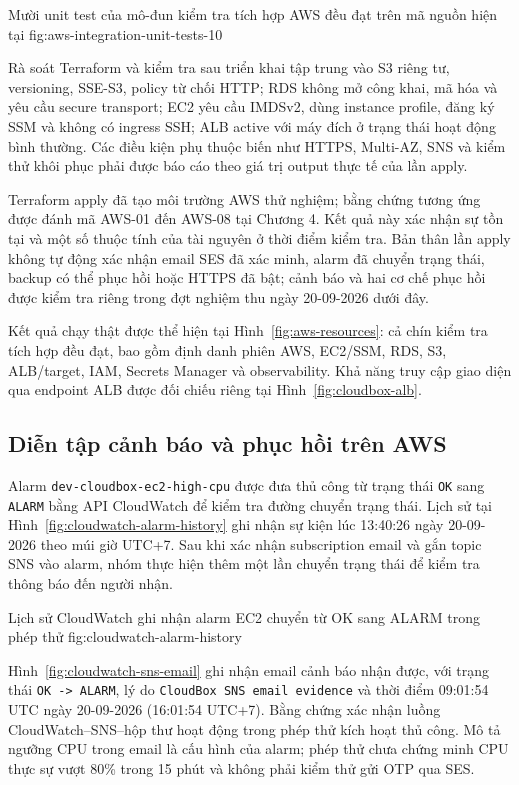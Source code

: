 {Mười unit test của mô-đun kiểm tra tích hợp AWS đều đạt trên mã nguồn hiện tại}
{fig:aws-integration-unit-tests-10}

Rà soát Terraform và kiểm tra sau triển khai tập trung vào S3 riêng tư, versioning, SSE-S3, policy từ chối HTTP; RDS không mở công khai, mã hóa và yêu cầu secure transport; EC2 yêu cầu IMDSv2, dùng instance profile, đăng ký SSM và không có ingress SSH; ALB active với máy đích ở trạng thái hoạt động bình thường. Các điều kiện phụ thuộc biến như HTTPS, Multi-AZ, SNS và kiểm thử khôi phục phải được báo cáo theo giá trị output thực tế của lần apply.

Terraform apply đã tạo môi trường AWS thử nghiệm; bằng chứng tương ứng được đánh mã AWS-01 đến AWS-08 tại Chương 4. Kết quả này xác nhận sự tồn tại và một số thuộc tính của tài nguyên ở thời điểm kiểm tra. Bản thân lần apply không tự động xác nhận email SES đã xác minh, alarm đã chuyển trạng thái, backup có thể phục hồi hoặc HTTPS đã bật; cảnh báo và hai cơ chế phục hồi được kiểm tra riêng trong đợt nghiệm thu ngày 20-09-2026 dưới đây.

Kết quả chạy thật được thể hiện tại Hình~\ref{fig:aws-resources}: cả chín kiểm tra tích hợp đều đạt, bao gồm định danh phiên AWS, EC2/SSM, RDS, S3, ALB/target, IAM, Secrets Manager và observability. Khả năng truy cập giao diện qua endpoint ALB được đối chiếu riêng tại Hình~\ref{fig:cloudbox-alb}.

\subsection{Diễn tập cảnh báo và phục hồi trên AWS}

Alarm \texttt{dev-cloudbox-ec2-high-cpu} được đưa thủ công từ trạng thái \texttt{OK} sang \texttt{ALARM} bằng API CloudWatch để kiểm tra đường chuyển trạng thái. Lịch sử tại Hình~\ref{fig:cloudwatch-alarm-history} ghi nhận sự kiện lúc 13:40:26 ngày 20-09-2026 theo múi giờ UTC+7. Sau khi xác nhận subscription email và gắn topic SNS vào alarm, nhóm thực hiện thêm một lần chuyển trạng thái để kiểm tra thông báo đến người nhận.

{Lịch sử CloudWatch ghi nhận alarm EC2 chuyển từ OK sang ALARM trong phép thử}
{fig:cloudwatch-alarm-history}

Hình~\ref{fig:cloudwatch-sns-email} ghi nhận email cảnh báo nhận được, với trạng thái \texttt{OK -> ALARM}, lý do \texttt{CloudBox SNS email evidence} và thời điểm 09:01:54 UTC ngày 20-09-2026 (16:01:54 UTC+7). Bằng chứng xác nhận luồng CloudWatch--SNS--hộp thư hoạt động trong phép thử kích hoạt thủ công. Mô tả ngưỡng CPU trong email là cấu hình của alarm; phép thử chưa chứng minh CPU thực sự vượt 80\% trong 15 phút và không phải kiểm thử gửi OTP qua SES.

